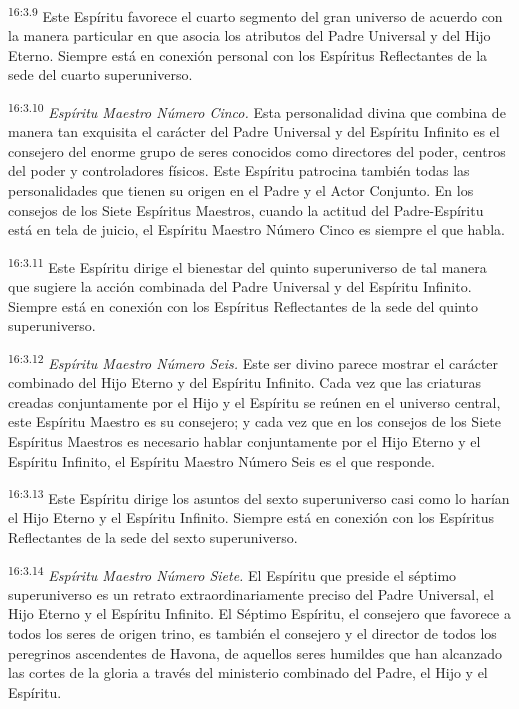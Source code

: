 \par
\textsuperscript{16:3.9} Este Espíritu favorece el cuarto segmento del gran universo de acuerdo con la manera particular en que asocia los atributos del Padre Universal y del Hijo Eterno. Siempre está en conexión personal con los Espíritus Reflectantes de la sede del cuarto superuniverso.

\par
\textsuperscript{16:3.10} \textit{Espíritu Maestro Número Cinco.} Esta personalidad divina que combina de manera tan exquisita el carácter del Padre Universal y del Espíritu Infinito es el consejero del enorme grupo de seres conocidos como directores del poder, centros del poder y controladores físicos. Este Espíritu patrocina también todas las personalidades que tienen su origen en el Padre y el Actor Conjunto. En los consejos de los Siete Espíritus Maestros, cuando la actitud del Padre-Espíritu está en tela de juicio, el Espíritu Maestro Número Cinco es siempre el que habla.

\par
\textsuperscript{16:3.11} Este Espíritu dirige el bienestar del quinto superuniverso de tal manera que sugiere la acción combinada del Padre Universal y del Espíritu Infinito. Siempre está en conexión con los Espíritus Reflectantes de la sede del quinto superuniverso.

\par
\textsuperscript{16:3.12} \textit{Espíritu Maestro Número Seis.} Este ser divino parece mostrar el carácter combinado del Hijo Eterno y del Espíritu Infinito. Cada vez que las criaturas creadas conjuntamente por el Hijo y el Espíritu se reúnen en el universo central, este Espíritu Maestro es su consejero; y cada vez que en los consejos de los Siete Espíritus Maestros es necesario hablar conjuntamente por el Hijo Eterno y el Espíritu Infinito, el Espíritu Maestro Número Seis es el que responde.

\par
\textsuperscript{16:3.13} Este Espíritu dirige los asuntos del sexto superuniverso casi como lo harían el Hijo Eterno y el Espíritu Infinito. Siempre está en conexión con los Espíritus Reflectantes de la sede del sexto superuniverso.

\par
\textsuperscript{16:3.14} \textit{Espíritu Maestro Número Siete.} El Espíritu que preside el séptimo superuniverso es un retrato extraordinariamente preciso del Padre Universal, el Hijo Eterno y el Espíritu Infinito. El Séptimo Espíritu, el consejero que favorece a todos los seres de origen trino, es también el consejero y el director de todos los peregrinos ascendentes de Havona, de aquellos seres humildes que han alcanzado las cortes de la gloria a través del ministerio combinado del Padre, el Hijo y el Espíritu.

